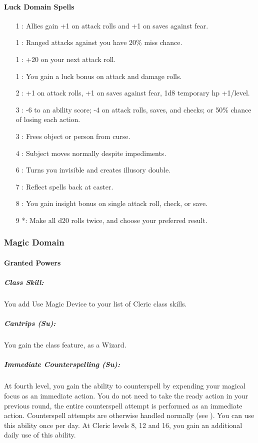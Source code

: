 \paragraph{Luck Domain Spells}
\begin{itemize}
\item[1] : Allies gain +1 on attack rolls and +1 on saves against fear.
\item[1] : Ranged attacks against you have 20\% miss chance.
\item[1] : +20 on your next attack roll.
\item[1] : You gain a luck bonus on attack and damage rolls.
\item[2] : +1 on attack rolls, +1 on saves against fear, 1d8 temporary hp +1/level.
\item[3] : -6 to an ability score; -4 on attack rolls, saves, and checks; or 50\% chance of losing each action.
\item[3] : Frees object or person from curse.
\item[4] : Subject moves normally despite impediments.
\item[6] : Turns you invisible and creates illusory double.
\item[7] : Reflect spells back at caster.
\item[8] : You gain insight bonus on single attack roll, check, or save.
\item[9] *: Make all d20 rolls twice, and choose your preferred result.
\end{itemize}
\subsubsection{Magic Domain}
\paragraph{Granted Powers}
\subparagraph{Class Skill:}
You add Use Magic Device to your list of Cleric class skills.
\subparagraph{Cantrips (Su):}
You gain the  class feature, as a Wizard.

\subparagraph{Immediate Counterspelling (Su):} 
At fourth level, you gain the ability to counterspell by expending your magical focus as an immediate action.
You do not need to take the ready action in your previous round, the entire counterspell attempt is performed as an immediate action.
Counterspell attempts are otherwise handled normally (see ).
You can use this ability once per day. At Cleric levels 8, 12 and 16, you gain an additional daily use of this ability.
